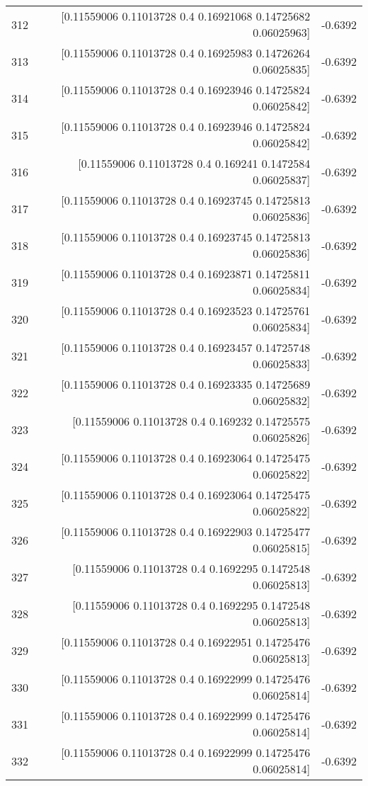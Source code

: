 \begin{longtable}{lrr}
312 & [0.11559006 0.11013728 0.4        0.16921068 0.14725682 0.06025963] & -0.6392 \\
313 & [0.11559006 0.11013728 0.4        0.16925983 0.14726264 0.06025835] & -0.6392 \\
314 & [0.11559006 0.11013728 0.4        0.16923946 0.14725824 0.06025842] & -0.6392 \\
315 & [0.11559006 0.11013728 0.4        0.16923946 0.14725824 0.06025842] & -0.6392 \\
316 & [0.11559006 0.11013728 0.4        0.169241   0.1472584  0.06025837] & -0.6392 \\
317 & [0.11559006 0.11013728 0.4        0.16923745 0.14725813 0.06025836] & -0.6392 \\
318 & [0.11559006 0.11013728 0.4        0.16923745 0.14725813 0.06025836] & -0.6392 \\
319 & [0.11559006 0.11013728 0.4        0.16923871 0.14725811 0.06025834] & -0.6392 \\
320 & [0.11559006 0.11013728 0.4        0.16923523 0.14725761 0.06025834] & -0.6392 \\
321 & [0.11559006 0.11013728 0.4        0.16923457 0.14725748 0.06025833] & -0.6392 \\
322 & [0.11559006 0.11013728 0.4        0.16923335 0.14725689 0.06025832] & -0.6392 \\
323 & [0.11559006 0.11013728 0.4        0.169232   0.14725575 0.06025826] & -0.6392 \\
324 & [0.11559006 0.11013728 0.4        0.16923064 0.14725475 0.06025822] & -0.6392 \\
325 & [0.11559006 0.11013728 0.4        0.16923064 0.14725475 0.06025822] & -0.6392 \\
326 & [0.11559006 0.11013728 0.4        0.16922903 0.14725477 0.06025815] & -0.6392 \\
327 & [0.11559006 0.11013728 0.4        0.1692295  0.1472548  0.06025813] & -0.6392 \\
328 & [0.11559006 0.11013728 0.4        0.1692295  0.1472548  0.06025813] & -0.6392 \\
329 & [0.11559006 0.11013728 0.4        0.16922951 0.14725476 0.06025813] & -0.6392 \\
330 & [0.11559006 0.11013728 0.4        0.16922999 0.14725476 0.06025814] & -0.6392 \\
331 & [0.11559006 0.11013728 0.4        0.16922999 0.14725476 0.06025814] & -0.6392 \\
332 & [0.11559006 0.11013728 0.4        0.16922999 0.14725476 0.06025814] & -0.6392 \\

\end{longtable}
